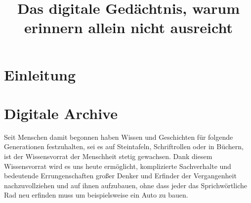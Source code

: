 \documentclass[conference,compsoc,final,a4paper]{IEEEtran}
\newcommand{\autoren}[0]{Nockel, Sascha}
\newcommand{\dokumententitel}[0]{Das digitale Gedächtnis, warum erinnern allein nicht ausreicht}
\begin{document}
\title{\dokumententitel}

\author{
  \IEEEauthorblockN{\autoren}
}

\maketitle
\thispagestyle{plain}
\pagestyle{plain}


\begin{abstract}

\end{abstract}

{\small\tableofcontents}

\section{Einleitung}


\section{Digitale Archive}
Seit Menschen damit begonnen haben Wissen und Geschichten für folgende Generationen festzuhalten, sei es auf Steintafeln, Schriftrollen oder in Büchern, ist der Wissensvorrat der Menschheit stetig gewachsen. Dank diesem Wissensvorrat wird es uns heute ermöglicht, komplizierte Sachverhalte und bedeutende Errungenschaften großer Denker und Erfinder der Vergangenheit nachzuvollziehen und auf ihnen aufzubauen, ohne dass jeder das Sprichwörtliche Rad neu erfinden muss um beispielsweise ein Auto zu bauen.
\end{document}
